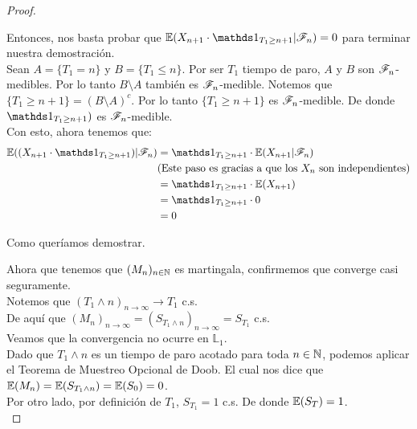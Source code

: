\begin{proof}
\begin{itemize}
				Entonces, nos basta probar que $\E(X_{n+1} \cdot \indic_{T_1 \geq n+1} |
				 \F_{n}) = 0$ para terminar nuestra demostración.\\
				 
				Sean $A = \{T_1 = n\}$ y $B = \{ T_1 \leq n\}$. Por ser $T_1$ tiempo de paro,
				$A$ y $B$ son $\mathscr{F}_n$-medibles. Por lo tanto $B \setminus A$ también es $\mathscr{F}_n$-medible. 
				Notemos que $\{T_1 \geq n+1\} = (B \setminus A)^c$. Por lo tanto $\{T_1 \geq n+1\}$ es
				$\mathscr{F}_n$-medible. De donde  $\indic_{T_1 \geq n+1})$ es $\mathscr{F}_n$-medible.\\
				
				Con esto, ahora tenemos que:
				\begin{align}
					\E((X_{n+1} \cdot \indic_{T_1 \geq n+1}) | \F_{n}) 	&= \indic_{T_1 \geq n+1} \cdot \E(X_{n+1} | \F_{n}) \\
																		&\mbox{(Este paso es gracias a que los $X_n$ son independientes)} \\
																		&=\indic_{T_1 \geq n+1} \cdot \E(X_{n+1} ) \\
																		&=\indic_{T_1 \geq n+1} \cdot 0 \\
																		&= 0
				\end{align}	
				
				Como queríamos demostrar.
		\end{itemize}
		
		Ahora que tenemos que $(M_n)_{n \in \mathbb{N}}$ es martingala, confirmemos que converge casi seguramente.\\
		
		Notemos que $(T_1 \wedge n)_{n \rightarrow \infty} \rightarrow T_1$ c.s.\\
		
		De aquí que $(M_n)_{n \rightarrow \infty} = (S_{T_1 \wedge n})_{n \rightarrow \infty} = S_{T_1}$ c.s. \\				
		
		Veamos que la convergencia no ocurre en $\mathbb{L}_1$. \\
					
		Dado que $T_1 \wedge n$ es un tiempo de paro acotado para toda $n \in \mathbb{N}$,
		podemos aplicar el Teorema de Muestreo Opcional de 	Doob. 
		El cual nos dice que $\mathbb{E}(M_n) = \mathbb{E}(S_{T_1 \wedge n}) = \mathbb{E}(S_0) = 0$.\\
		
		Por otro lado, por definición de $T_1$, $S_{T_1} = 1$ c.s.	De donde $\mathbb{E}(S_T) = 1$.\\
		

\end{proof}
